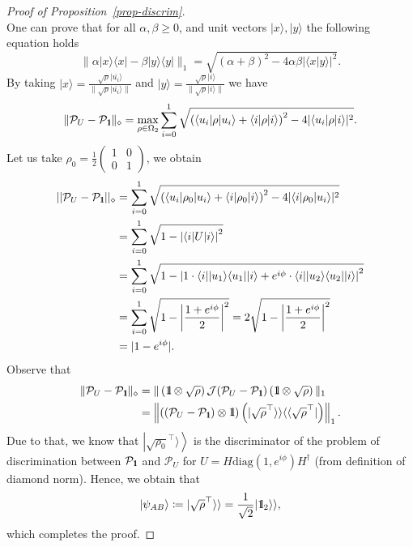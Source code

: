 \documentclass[preprint,12pt, a4paper]{elsarticle}
\newcommand{\ket}[1]{\ensuremath{|#1\rangle}}
\newcommand{\bra}[1]{\ensuremath{\langle#1|}}
\newcommand{\ketbra}[2]{\ensuremath{\ket{#1}\bra{#2}}}
\newcommand{\proj}[1]{\ensuremath{\ketbra{#1}{#1}}}
\newcommand{\braket}[2]{\ensuremath{\langle{#1}|{#2}\rangle}}
\newcommand{\1}{{\rm 1\hspace{-0.9mm}l}}
\newcommand{\Id}{{\rm 1\hspace{-0.9mm}l}}
\newcommand{\PP}{\mathcal{P}}
\newcommand{\diag}{\mathrm{diag}}
\begin{document}
\begin{proof}[Proof of Proposition~\ref{prop-discrim}]
\begin{equation}
	\end{equation}
	One can prove that for all $\alpha, \beta \ge 0 $, and unit vectors $\ket{x}, 
	\ket{y}$ the following equation holds~\cite{watrous} 
	\begin{equation}
	\| \alpha \proj{x} - \beta\proj{y} \|_1 = \sqrt{(\alpha + \beta)^2 - 4\alpha 
		\beta |\braket{x}{y}|^2}.
	\end{equation}
	By taking $\ket{x} = \frac{\sqrt{\rho} \ket{\bar{u_i}}}{\| \sqrt{\rho} 
		\ket{\bar{u_i}} \|}$ and $ \ket{y} = \frac{\sqrt{\rho} \ket{i}}{\|\sqrt{\rho} 
		\ket{i} \|}$ we have
	\begin{equation}
	\| \PP_{U} - \PP_{\Id}  \|_\diamond  = \max_{\rho \in \Omega_2} 
	\sum_{i=0}^{1} \sqrt{\left( \bra{u_i} \rho \ket{u_i} + \bra{i} \rho \ket{i 
		}\right)^2 - 4 | \bra{u_i} \rho \ket{i} |^2}.
	\end{equation}
	Let us take  $\rho_0 =   \frac{1}{2}  	
	\left(\begin{array}{cc}1&0\\0&1\end{array}\right)  $,   we obtain
	\begin{equation}
	\begin{split}
	||\mathcal{P}_U - \mathcal{P}_{\1}||_\diamond 
	&= \sum_{i=0}^1  
	\sqrt{\left(\bra{u_i}\rho_0\ket{u_i} + \bra{i} \rho_0 \ket{i} \right)^2 - 
		4|\bra{i}\rho_0\ket{u_i}|^2}  \\
	&= \sum_{i=0}^1  \sqrt{ 1 -  \left| \bra{i}  U \ket{i }\right|^2} 
	\\ 
	&=\sum_{i=0}^1  \sqrt{1 -  \left| 1 \cdot \bra{i} \proj{u_1} 
		\ket{i} + e^{i \phi} \cdot\bra{i}  \proj{u_2}\ket{i}\right|^2} \\
	&= \sum_{i=0}^1 
	\sqrt{1 -\left| \frac{1+ e^{i \phi}}{2}\right|^2 } 
	= 2 \sqrt{1 -\left| \frac{1+e^{i \phi}}{2}\right|^2 } \\
	&= |1-e^{i \phi }|.
	\end{split}
	\end{equation}
	Observe that
	\begin{equation}
	\begin{split}
	\| \PP_{U} - \PP_{\Id}  \|_\diamond  
	&=  \| \left( \Id \otimes \sqrt{\rho} \right) \mathcal{J}(\PP_{U} - \PP_{\Id} )  \left( 
	\Id \otimes \sqrt{\rho} \right) \|_1 \\
	&= \left\| ( (\PP_{U} - \PP_\Id) \otimes \Id) \left(  | \sqrt{\rho}^\top 
	\rangle \rangle \langle \langle \sqrt{\rho}^\top | \right) \right\|_1.
	\end{split}
	\end{equation}
	Due to that, we know  
	that $\left| \sqrt{\rho_0}^{\top} \rangle \right\rangle$ is the discriminator of the problem 
	of discrimination between 
	$\PP_{\Id} $ and $\PP_U$ for 
	$ U =  H \diag(1, e^{i \phi}) H^\dagger$ (from definition of diamond norm).      Hence, we obtain that \begin{equation}
	\ket{\psi_{AB}} \coloneqq   | \sqrt{\rho}^\top \rangle \rangle = \frac{1}{\sqrt{2} } | 
	\Id_2 \rangle \rangle,
	\end{equation}
	which completes the proof.
\end{proof}
\end{document}
